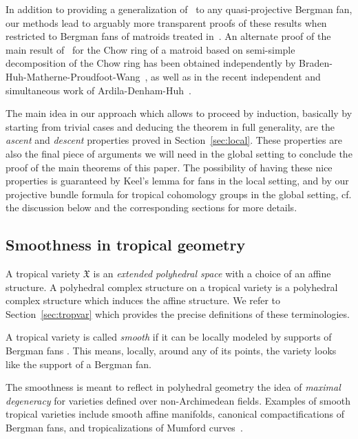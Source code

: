 \documentclass[11pt]{amsart}
\theoremstyle{definition}
\numberwithin{equation}{section}
\newcommand{\cf}[1]{cf.}
\renewcommand{\~}{\widetilde}
\newcommand{\X}{\mathfrak X}
\begin{document}
\smallskip
In addition to providing a generalization of~\cite{AHK} to any quasi-projective Bergman fan, our methods lead to arguably more transparent proofs of these results when restricted to Bergman fans of matroids treated in~\cite{AHK}. An alternate proof of the main result of~\cite{AHK} for the Chow ring of a matroid based on semi-simple decomposition of the Chow ring has been obtained independently by Braden-Huh-Matherne-Proudfoot-Wang~\cite{BHMPW}, as well as in the recent independent and simultaneous work of Ardila-Denham-Huh~\cite{ADH}.

\medskip

The main idea in our approach which allows to proceed by induction, basically by starting from trivial cases and deducing the theorem in full generality, are the \emph{ascent} and \emph{descent} properties proved in Section~\ref{sec:local}. These properties are also the final piece of arguments we will need in the global setting to conclude the proof of the main theorems of this paper. The possibility of having these nice properties is guaranteed by Keel's lemma for fans in the local setting, and by our projective bundle formula for tropical cohomology groups in the global setting, \cf. the discussion below and the corresponding sections for more details.



\subsection{Smoothness in tropical geometry} \label{sec:smoothness_intro} A tropical variety $\X$ is an \emph{extended polyhedral space} with a choice of an affine structure. A polyhedral complex structure on a tropical variety is a polyhedral complex structure which induces the affine structure. We refer to Section~\ref{sec:tropvar} which provides the precise definitions of these terminologies.

\smallskip
A tropical variety is called \emph{smooth} if it can be locally modeled by supports of Bergman fans \cites{IKMZ, MZ, JSS}. This means, locally, around any of its points, the variety looks like the support of a Bergman fan.

\smallskip
The smoothness is meant to reflect in polyhedral geometry the idea of \emph{maximal degeneracy} for varieties defined over non-Archimedean fields. Examples of smooth tropical varieties include smooth affine manifolds, canonical compactifications of Bergman fans, and tropicalizations of Mumford curves~\cite{Jell-MC}.
\end{document}

